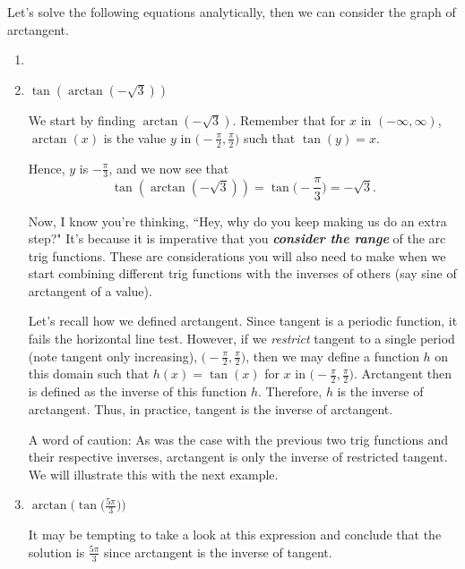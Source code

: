 \documentclass{ximera}
\begin{document}
\begin{example}
Let's solve the following equations analytically, then we can consider the graph of arctangent.	
\begin{enumerate}
\item

\item $\tan(\arctan(-\sqrt{3}))$\\
\begin{explanation}
We start by finding $\arctan(-\sqrt{3})$. Remember that for $x$ in $(-\infty,\infty)$, $\arctan(x)$ is the value $y$ in $\Big(\!-\frac{\pi}{2},\frac{\pi}{2}\Big)$ such that $\tan(y) = x$. 

Hence, $y$ is $-\frac{\pi}{3}$, and we now see that 
\begin{equation*}
\tan(\arctan(-\sqrt{3})) = \tan\Big(\!-\frac{\pi}{3}\Big) = -\sqrt{3}.
\end{equation*}

Now, I know you're thinking, ``Hey, why do you keep making us do an extra step?" It's because it is imperative that you \textbf{\textit{consider the range}} of the arc trig functions. These are considerations you will also need to make when we start combining different trig functions with the inverses of others (say sine of arctangent of a value).

Let's recall how we defined arctangent. Since tangent is a periodic function, it fails the horizontal line test. However, if we {\it restrict} tangent to a single period (note tangent only increasing), $\Big(\!-\frac{\pi}{2},\frac{\pi}{2}\Big)$, then we may define a function $h$ on this domain such that $h(x) = \tan(x)$ for $x$ in $\Big(\!-\frac{\pi}{2},\frac{\pi}{2}\Big)$. Arctangent then is defined as the inverse of this function $h$. Therefore, $h$ is the inverse of arctangent. 
Thus, in practice, tangent is the inverse of arctangent. 

A word of caution: As was the case with the previous two trig functions and their respective inverses, arctangent is only the inverse of restricted tangent. We will illustrate this with the next example.
\end{explanation}


\item $\arctan\!\Big(\!\tan\!\Big(\frac{5\pi}{3}\Big)\Big)$

\begin{explanation}
It may be tempting to take a look at this expression and conclude that the solution is $\frac{5\pi}{3}$ since arctangent is the inverse of tangent. 


\end{explanation}
\end{enumerate}
\end{example}
\end{document}
